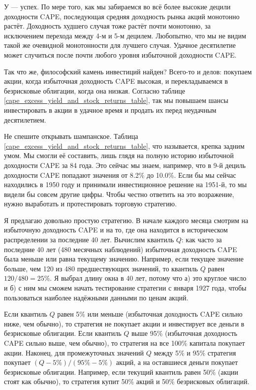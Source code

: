 У --- успех. По мере того, как мы забираемся во всё более высокие децили 
доходности CAPE, последующая средняя доходность рынка акций монотонно растёт. 
Доходность худшего случая тоже растёт почти монотонно, за исключением перехода 
между 4-м и 5-м децилем. Любопытно, что мы не видим такой же очевидной 
монотонности для лучшего случая. Удачное десятилетие может случиться  
после почти любого уровня избыточной доходности CAPE.

Так что же, философский камень инвестиций найден? Всего-то и делов: покупаем 
акции, когда избыточная доходность CAPE высокая, и перекладываемся в 
безрисковые облигации, когда она низкая. Согласно таблице 
\ref{cape_excess_yield_and_stock_returns_table}, так мы повышаем шансы 
инвестировать в акции в удачное время и продать их перед неудачным 
десятилетием.

Не спешите открывать шампанское. Таблица 
\ref{cape_excess_yield_and_stock_returns_table}, что называется, крепка задним 
умом. Мы смогли её составить, лишь глядя на полную историю избыточной 
доходности CAPE за 84 года. Это сейчас мы знаем, например, что в 9-й дециль 
доходности CAPE попадают значения от 8.2\% до 10.0\%. Если бы мы сейчас 
находились в 1950 году и принимали инвестиционное решение на 1951-й, то мы 
видели бы совсем другие цифры. Чтобы честно ответить на это возражение, нужно 
выработать и протестировать торговую стратегию.

Я предлагаю довольно простую стратегию. В начале каждого месяца смотрим на 
избыточную доходность CAPE и на то, где она находится в историческом 
распределении за последние 40 лет. Вычислим квантиль $Q$: как часто за 
последние 40 лет (480 месячных наблюдений) избыточная доходность CAPE была 
меньше или равна текущему значению. Например, если текущее значение больше, 
чем 120 из 480 предшествующих значений, то квантиль $Q$ равен
$120/480 = 25\%$. Я выбрал длину окна в 40 лет, потому что а) это круглое 
число и б) с ним мы сможем начать тестирование стратегии с января 1927 года, 
чтобы пользоваться наиболее надёжными данными по ценам акций.

Если квантиль $Q$ равен 5\% или меньше (избыточная доходность CAPE сильно 
ниже, чем обычно), то стратегия не покупает акции и инвестирует все деньги в 
безрисковые облигации. Если квантиль $Q$ выше 95\% (избыточная доходность CAPE 
сильно выше, чем обычно), то стратегия на все 100\% капитала покупает акции. 
Наконец, для промежуточных значений $Q$ между 5\% и 95\% стратегия покупает
$(Q - 5\%) / (95\% - 5\%)$ акций, а на оставшиеся деньги покупает безрисковые 
облигации. Например, если текущий квантиль равен 50\% (акции стоят как
обычно), то стратегия купит 50\% акций и 50\% безрисковых облигаций.

